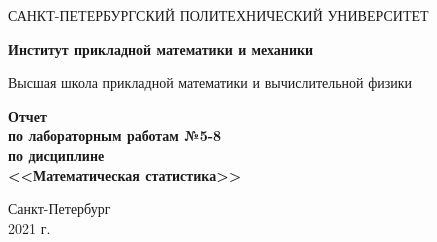 \begin{titlepage}
   \begin{center}
       \vspace*{3cm}
       \large{САНКТ-ПЕТЕРБУРГСКИЙ ПОЛИТЕХНИЧЕСКИЙ УНИВЕРСИТЕТ}
       \vspace{0.4 cm}
       
       \large\textbf{Институт прикладной математики и механики}
       \vspace{0.4 cm}
       
       \large{Высшая школа прикладной математики и вычислительной физики}
       
       \vspace{3 cm}
       \normalsize\textbf{Отчет\\ по лабораторным работам №5-8 \\ по дисциплине \\ <<Математическая статистика>>}
       \vfill
            
       \vspace{0.8cm}
     
            
       \normalsize{Санкт-Петербург\\2021 г.}
            
   \end{center}
\end{titlepage}